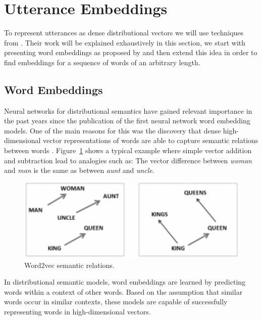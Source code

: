 \section{Utterance Embeddings}\label{sec:utt2vec}
To represent utterances as dense distributional vectors we will use techniques from . Their work will be explained exhaustively in this section, we start with presenting word embeddings as proposed by  and then extend this idea in order to find embeddings for a sequence of words of an arbitrary length.

\subsection{Word Embeddings}
Neural networks for distributional semantics have gained relevant importance in the past years since the publication of the first neural network word embedding models.
One of the main reasons for this was the discovery that dense high-dimensional vector representations of words are able to capture semantic relations between words .
Figure~\ref{fig:w2v_example} shows a typical example where simple vector addition and subtraction lead to analogies such as: The vector difference between \textit{woman} and \textit{man} is the same as between \textit{aunt} and \textit{uncle}.


\begin{figure}
\centering
\begin{minipage}{.4\textwidth}
\includegraphics[width=1\textwidth]{img/w2v_example}
\caption{Word2vec semantic relations.}
\label{fig:w2v_example}
\end{minipage}
\end{figure}

In distributional semantic models, word embeddings are learned by predicting words within a context of other words.
Based on the assumption that similar words occur in similar contexts, these models are capable of successfully representing words in high-dimensional vectors. 


